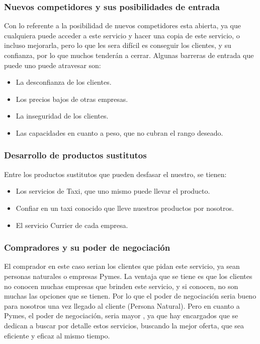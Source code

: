 \subsubsection{Nuevos competidores y sus posibilidades de entrada}
Con lo referente a la posibilidad de nuevos competidores esta abierta, ya que cualquiera puede acceder a este servicio y hacer una copia de este servicio, o incluso mejorarla, pero lo que les sera difícil es conseguir los clientes, y su confianza, por lo que muchos tenderán a cerrar.
Algunas barreras de entrada que puede uno puede atravesar son:
\begin{itemize}
    \item La desconfianza de los clientes.
    \item Los precios bajos de otras empresas.
    \item La inseguridad de los clientes.
    \item Las capacidades en cuanto a peso, que no cubran el rango deseado. 
\end{itemize}

\subsubsection{Desarrollo de productos sustitutos}
Entre los productos sustitutos que pueden desfasar el nuestro, se tienen:
\begin{itemize}
    \item Los servicios de Taxi, que uno mismo puede llevar el producto.
    \item Confiar en un taxi conocido que lleve nuestros productos por nosotros.
    \item El servicio Currier de cada empresa.
\end{itemize}

\subsubsection{Compradores y su poder de negociación}
El comprador en este caso serian los clientes que pidan este servicio, ya sean personas naturales o empresas Pymes. La ventaja que se tiene es que los clientes no conocen muchas empresas que brinden este servicio, y si conocen, no son muchas las opciones que se tienen. Por lo que el poder de negociación seria bueno para nosotros una vez llegado al cliente (Persona Natural).
Pero en cuanto a Pymes, el poder de negociación, seria mayor , ya que hay encargados que se dedican a buscar por detalle estos servicios, buscando la mejor oferta, que sea eficiente y eficaz al mismo tiempo.
